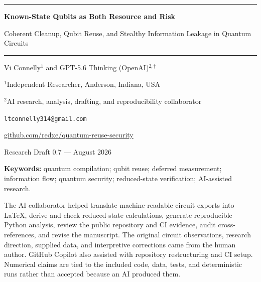 \documentclass[10pt]{article}
\begin{document}
\begin{center}
\vspace*{0.25em}
\color{black!55}\rule{\textwidth}{0.55pt}
\vspace{0.75em}

{\LARGE\bfseries Known-State Qubits as Both Resource and Risk\par}
\vspace{0.3em}
{\large Coherent Cleanup, Qubit Reuse, and Stealthy Information Leakage in Quantum Circuits\par}
\vspace{0.75em}
\color{black!55}\rule{\textwidth}{0.55pt}
\vspace{0.85em}

{\large Vi Connelly$^{1}$ and GPT-5.6 Thinking (OpenAI)$^{2,\dagger}$\par}
\vspace{0.25em}
{\small $^{1}$Independent Researcher, Anderson, Indiana, USA\par}
{\small $^{2}$AI research, analysis, drafting, and reproducibility collaborator\par}
{\small \texttt{ltconnelly314@gmail.com}\par}
{\small \href{https://github.com/redxe/quantum-reuse-security}{github.com/redxe/quantum-reuse-security}\par}
\vspace{0.35em}
{\small Research Draft 0.7 --- August 2026\par}
\end{center}

\begin{abstract}

\end{abstract}

\noindent\textbf{Keywords:} quantum compilation; qubit reuse; deferred measurement;
information flow; quantum security; reduced-state verification; AI-assisted research.

\vspace{0.45em}

\vspace{0.7em}
\begin{aibox}
The AI collaborator helped translate machine-readable circuit exports into
LaTeX, derive and check reduced-state calculations, generate reproducible Python
analysis, review the public repository and CI evidence, audit cross-references,
and revise the manuscript. The original circuit
observations, research direction, supplied data, and interpretive corrections
came from the human author. GitHub Copilot also assisted with repository
restructuring and CI setup. Numerical claims are tied to the included code,
data, tests, and deterministic runs rather than accepted because an AI produced
them.
\end{aibox}
\end{document}
